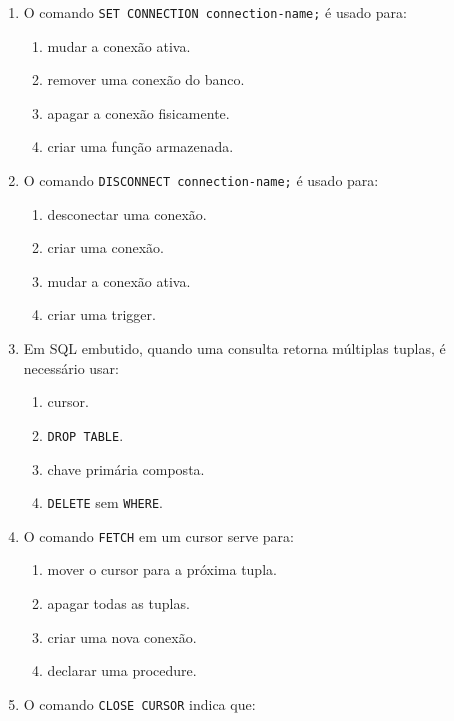 \documentclass[12pt,a4paper]{article}
\begin{document}
\begin{enumerate}[label=\textbf{Q\arabic*.}]
\item O comando \texttt{SET CONNECTION connection-name;} é usado para:

\begin{enumerate}[label=\alph*)]
    \item mudar a conexão ativa.
    \item remover uma conexão do banco.
    \item apagar a conexão fisicamente.
    \item criar uma função armazenada.
\end{enumerate}

\item O comando \texttt{DISCONNECT connection-name;} é usado para:

\begin{enumerate}[label=\alph*)]
    \item desconectar uma conexão.
    \item criar uma conexão.
    \item mudar a conexão ativa.
    \item criar uma trigger.
\end{enumerate}

\item Em SQL embutido, quando uma consulta retorna múltiplas tuplas, é necessário usar:

\begin{enumerate}[label=\alph*)]
    \item cursor.
    \item \texttt{DROP TABLE}.
    \item chave primária composta.
    \item \texttt{DELETE} sem \texttt{WHERE}.
\end{enumerate}

\item O comando \texttt{FETCH} em um cursor serve para:

\begin{enumerate}[label=\alph*)]
    \item mover o cursor para a próxima tupla.
    \item apagar todas as tuplas.
    \item criar uma nova conexão.
    \item declarar uma procedure.
\end{enumerate}

\item O comando \texttt{CLOSE CURSOR} indica que:


\end{enumerate}
\end{document}
